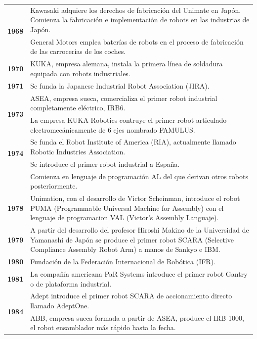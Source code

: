 \begin{longtable}[c]{c m{12cm}}
     \multirow{2}{*}{\textbf{1968}} & Kawasaki adquiere los derechos de fabricación del Unimate en Japón. Comienza la fabricación e implementación de robots en las industrias de Japón. \\ \cline{2-2}
      & General Motors emplea baterías de robots en el proceso de fabricación de las carrocerías de los coches.\\ \hline
     \textbf{1970} & KUKA, empresa alemana, instala la primera línea de soldadura equipada con robots industriales. \\ \hline
     \textbf{1971} & Se funda la Japanese Industrial Robot Association (JIRA). \\ \hline
     \multirow{2}{*}{\textbf{1973}} & ASEA, empresa sueca, comercializa el primer robot industrial completamente eléctrico, IRB6. \\ \cline{2-2}
      & La empresa KUKA Robotics contruye el primer robot articulado electromecánicamente de 6 ejes nombrado FAMULUS.\\ \hline
     \multirow{2}{*}{\textbf{1974}} & Se funda el Robot Institute of America (RIA), actualmente llamado Robotic Industries Association.  \\ \cline{2-2}
             & Se introduce el primer robot industrial a España. \\ \cline{2-2}
             & Comienza en lenguaje de programación AL del que derivan otros robots posteriormente. \\ \hline
     \textbf{1978} & Unimation, con el desarrollo de Victor Scheinman, introduce el robot PUMA (Programmable Universal Machine for Assembly) con el lenguaje de programacion VAL (Victor’s Assembly Languaje). \\ \hline
     \textbf{1979} & A partir del desarrollo del profesor Hiroshi Makino de la Universidad de Yamanashi de Japón se produce el primer robot SCARA (Selective Compliance Assembly Robot Arm) a manos de Sankyo e IBM. \\ \hline
     \textbf{1980} & Fundación de la Federación Internacional de Robótica (IFR). \\ \hline
     \textbf{1981} & La compañía americana PaR Systems introduce el primer robot Gantry o de plataforma industrial. \\ \hline
     \multirow{2}{*}{\textbf{1984}} & Adept introduce el primer robot SCARA de accionamiento directo llamado AdeptOne. \\ \cline{2-2}
      &  ABB, empresa sueca formada a partir de ASEA, produce el IRB 1000, el robot ensamblador más rápido hasta la fecha. \\ \hline

\end{longtable}
